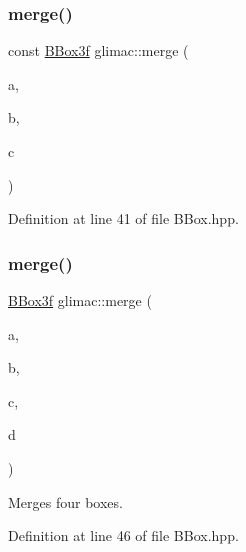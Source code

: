 \subsubsection{\texorpdfstring{merge()}{merge()}\hspace{0.1cm}{\footnotesize\ttfamily [4/6]}}
{\footnotesize\ttfamily const \hyperlink{structglimac_1_1_b_box3f}{B\+Box3f} glimac\+::merge (\begin{DoxyParamCaption}\item[{const \hyperlink{structglimac_1_1_b_box3f}{B\+Box3f} \&}]{a,  }\item[{const \hyperlink{structglimac_1_1_b_box3f}{B\+Box3f} \&}]{b,  }\item[{const \hyperlink{structglimac_1_1_b_box3f}{B\+Box3f} \&}]{c }\end{DoxyParamCaption})\hspace{0.3cm}{\ttfamily [inline]}}



Definition at line 41 of file B\+Box.\+hpp.

\mbox{\label{namespaceglimac_a8680d09f3e2292f083f6cefce95d41e7}} 
\subsubsection{\texorpdfstring{merge()}{merge()}\hspace{0.1cm}{\footnotesize\ttfamily [5/6]}}
{\footnotesize\ttfamily \hyperlink{structglimac_1_1_b_box3f}{B\+Box3f} glimac\+::merge (\begin{DoxyParamCaption}\item[{const \hyperlink{structglimac_1_1_b_box3f}{B\+Box3f} \&}]{a,  }\item[{const \hyperlink{structglimac_1_1_b_box3f}{B\+Box3f} \&}]{b,  }\item[{const \hyperlink{structglimac_1_1_b_box3f}{B\+Box3f} \&}]{c,  }\item[{const \hyperlink{structglimac_1_1_b_box3f}{B\+Box3f} \&}]{d }\end{DoxyParamCaption})\hspace{0.3cm}{\ttfamily [inline]}}

Merges four boxes. 

Definition at line 46 of file B\+Box.\+hpp.

\mbox{\label{namespaceglimac_a2c45c463e7e0e8e818226772ae1319d8}} 
